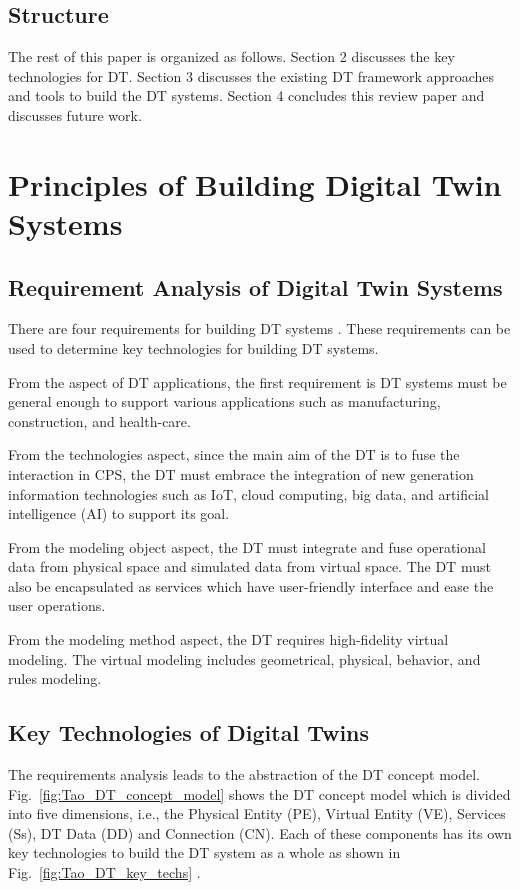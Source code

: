 \documentclass[article,table]{aaltoseries}
\begin{document}
\subsection{Structure}
\label{sec:em}
The rest of this paper is organized as follows. Section 2 discusses the key technologies for DT. Section 3 discusses the existing DT framework approaches and tools to build the DT systems. Section 4 concludes this review paper and discusses future work.
 





\section{Principles of Building Digital Twin Systems}
\subsection{Requirement Analysis of Digital Twin Systems}
There are four requirements for building DT systems \cite{Tao2019}. These requirements can be used to determine key technologies for building DT systems.

From the aspect of DT applications, the first requirement is DT systems must be general enough to support various applications such as manufacturing, construction, and health-care.

From the technologies aspect, since the main aim of the DT is to fuse the interaction in CPS, the DT must embrace the integration of new generation information technologies such as IoT, cloud computing, big data, and artificial intelligence (AI) to support its goal.

From the modeling object aspect, the DT must integrate and fuse operational data from physical space and simulated data from virtual space. The DT must also be encapsulated as services which have user-friendly interface and ease the user operations.

From the modeling method aspect, the DT requires high-fidelity virtual modeling. The virtual modeling includes geometrical, physical, behavior, and rules modeling.

\subsection{Key Technologies of Digital Twins}
The requirements analysis leads to the abstraction of the DT concept model. Fig.~\ref{fig:Tao_DT_concept_model} shows the DT concept model which is divided into five dimensions, i.e., the Physical Entity (PE), Virtual Entity (VE), Services (Ss), DT Data (DD) and Connection (CN). Each of these components has its own key technologies to build the DT system as a whole as shown in Fig.~\ref{fig:Tao_DT_key_techs} \cite{Tao2019}.
\end{document}
